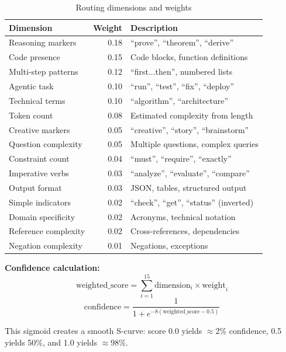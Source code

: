 \documentclass{article}
\begin{document}
\begin{table}[h]
\centering
\caption{Routing dimensions and weights}
\label{tab:dimensions}
\small
\begin{tabular}{lrl}
\toprule
\textbf{Dimension} & \textbf{Weight} & \textbf{Description} \\
\midrule
Reasoning markers & 0.18 & ``prove'', ``theorem'', ``derive'' \\
Code presence & 0.15 & Code blocks, function definitions \\
Multi-step patterns & 0.12 & ``first...then'', numbered lists \\
Agentic task & 0.10 & ``run'', ``test'', ``fix'', ``deploy'' \\
Technical terms & 0.10 & ``algorithm'', ``architecture'' \\
Token count & 0.08 & Estimated complexity from length \\
Creative markers & 0.05 & ``creative'', ``story'', ``brainstorm'' \\
Question complexity & 0.05 & Multiple questions, complex queries \\
Constraint count & 0.04 & ``must'', ``require'', ``exactly'' \\
Imperative verbs & 0.03 & ``analyze'', ``evaluate'', ``compare'' \\
Output format & 0.03 & JSON, tables, structured output \\
Simple indicators & 0.02 & ``check'', ``get'', ``status'' (inverted) \\
Domain specificity & 0.02 & Acronyms, technical notation \\
Reference complexity & 0.02 & Cross-references, dependencies \\
Negation complexity & 0.01 & Negations, exceptions \\
\bottomrule
\end{tabular}
\end{table}

\textbf{Confidence calculation:}
\begin{equation}
\text{weighted\_score} = \sum_{i=1}^{15} \text{dimension}_i \times \text{weight}_i
\end{equation}
\begin{equation}
\text{confidence} = \frac{1}{1 + e^{-8(\text{weighted\_score} - 0.5)}}
\end{equation}

This sigmoid creates a smooth S-curve: score 0.0 yields $\approx$2\% confidence, 0.5 yields 50\%, and 1.0 yields $\approx$98\%.
\end{document}
